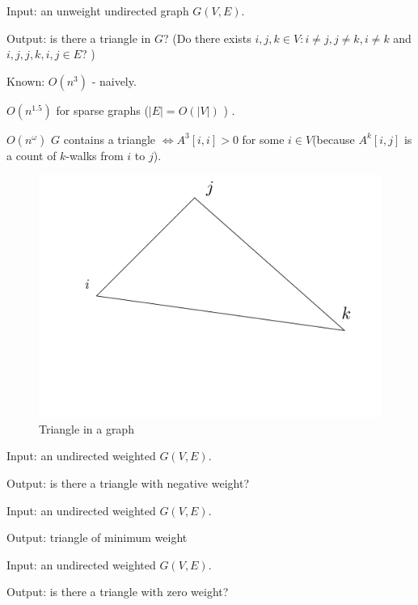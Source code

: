 \begin{df}
	Input: an unweight undirected graph $G(V, E)$.

	Output: is there a triangle in $G$? (Do there exists $i, j, k \in V : i \neq j, j \neq k, i \neq k$ and ${i, j}, {j, k}, {i, j} \in E$?  )

	Known: $O(n^3)$ - naively.

	$O(n^{1.5})$ for sparse graphs ($|E| = O(|V|)$ ) .

	$O(n^{\omega})$ $G$ contains a triangle $\Leftrightarrow A^3[i, i] > 0$ for some $i \in V$(because $A^k[i, j]$ is a count of $k$-walks from $i$ to $j$).

	\begin{figure}[ht]
		\centering
		\includegraphics[scale=0.3]{figures/5.pdf}
		\caption{Triangle in a graph}
	\end{figure}
\end{df}

\begin{df}
	\label{df:negative_triangle}
	Input: an undirected weighted $G(V, E)$.

	Output: is there a triangle with negative weight?
\end{df}

\begin{df}
	Input: an undirected weighted $G(V, E)$.

	Output: triangle of minimum weight
\end{df}

\begin{df}
	Input: an undirected weighted $G(V, E)$.

	Output: is there a triangle with zero weight?
\end{df}

